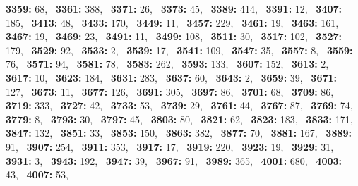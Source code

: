 \textbf{3359:} 68,\allowbreak~ 
\textbf{3361:} 388,\allowbreak~ 
\textbf{3371:} 26,\allowbreak~ 
\textbf{3373:} 45,\allowbreak~ 
\textbf{3389:} 414,\allowbreak~ 
\textbf{3391:} 12,\allowbreak~ 
\textbf{3407:} 185,\allowbreak~ 
\textbf{3413:} 48,\allowbreak~ 
\textbf{3433:} 170,\allowbreak~ 
\textbf{3449:} 11,\allowbreak~ 
\textbf{3457:} 229,\allowbreak~ 
\textbf{3461:} 19,\allowbreak~ 
\textbf{3463:} 161,\allowbreak~ 
\textbf{3467:} 19,\allowbreak~ 
\textbf{3469:} 23,\allowbreak~ 
\textbf{3491:} 11,\allowbreak~ 
\textbf{3499:} 108,\allowbreak~ 
\textbf{3511:} 30,\allowbreak~ 
\textbf{3517:} 102,\allowbreak~ 
\textbf{3527:} 179,\allowbreak~ 
\textbf{3529:} 92,\allowbreak~ 
\textbf{3533:} 2,\allowbreak~ 
\textbf{3539:} 17,\allowbreak~ 
\textbf{3541:} 109,\allowbreak~ 
\textbf{3547:} 35,\allowbreak~ 
\textbf{3557:} 8,\allowbreak~ 
\textbf{3559:} 76,\allowbreak~ 
\textbf{3571:} 94,\allowbreak~ 
\textbf{3581:} 78,\allowbreak~ 
\textbf{3583:} 262,\allowbreak~ 
\textbf{3593:} 133,\allowbreak~ 
\textbf{3607:} 152,\allowbreak~ 
\textbf{3613:} 2,\allowbreak~ 
\textbf{3617:} 10,\allowbreak~ 
\textbf{3623:} 184,\allowbreak~ 
\textbf{3631:} 283,\allowbreak~ 
\textbf{3637:} 60,\allowbreak~ 
\textbf{3643:} 2,\allowbreak~ 
\textbf{3659:} 39,\allowbreak~ 
\textbf{3671:} 127,\allowbreak~ 
\textbf{3673:} 11,\allowbreak~ 
\textbf{3677:} 126,\allowbreak~ 
\textbf{3691:} 305,\allowbreak~ 
\textbf{3697:} 86,\allowbreak~ 
\textbf{3701:} 68,\allowbreak~ 
\textbf{3709:} 86,\allowbreak~ 
\textbf{3719:} 333,\allowbreak~ 
\textbf{3727:} 42,\allowbreak~ 
\textbf{3733:} 53,\allowbreak~ 
\textbf{3739:} 29,\allowbreak~ 
\textbf{3761:} 44,\allowbreak~ 
\textbf{3767:} 87,\allowbreak~ 
\textbf{3769:} 74,\allowbreak~ 
\textbf{3779:} 8,\allowbreak~ 
\textbf{3793:} 30,\allowbreak~ 
\textbf{3797:} 45,\allowbreak~ 
\textbf{3803:} 80,\allowbreak~ 
\textbf{3821:} 62,\allowbreak~ 
\textbf{3823:} 183,\allowbreak~ 
\textbf{3833:} 171,\allowbreak~ 
\textbf{3847:} 132,\allowbreak~ 
\textbf{3851:} 33,\allowbreak~ 
\textbf{3853:} 150,\allowbreak~ 
\textbf{3863:} 382,\allowbreak~ 
\textbf{3877:} 70,\allowbreak~ 
\textbf{3881:} 167,\allowbreak~ 
\textbf{3889:} 91,\allowbreak~ 
\textbf{3907:} 254,\allowbreak~ 
\textbf{3911:} 353,\allowbreak~ 
\textbf{3917:} 17,\allowbreak~ 
\textbf{3919:} 220,\allowbreak~ 
\textbf{3923:} 19,\allowbreak~ 
\textbf{3929:} 31,\allowbreak~ 
\textbf{3931:} 3,\allowbreak~ 
\textbf{3943:} 192,\allowbreak~ 
\textbf{3947:} 39,\allowbreak~ 
\textbf{3967:} 91,\allowbreak~ 
\textbf{3989:} 365,\allowbreak~ 
\textbf{4001:} 680,\allowbreak~ 
\textbf{4003:} 43,\allowbreak~ 
\textbf{4007:} 53,\allowbreak~ 
